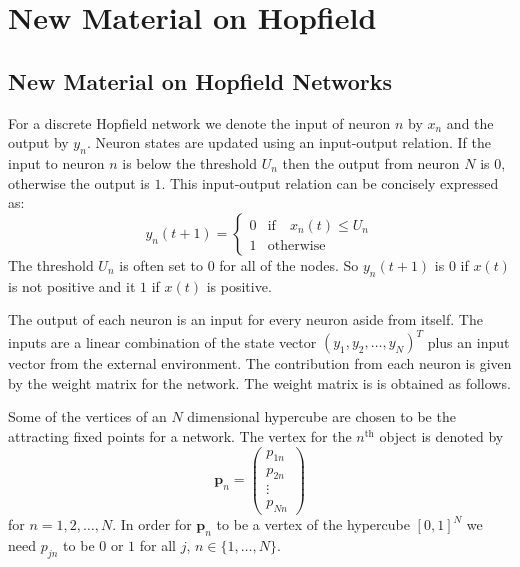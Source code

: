 \chapter{New Material on Hopfield}

\section{New Material on Hopfield Networks}

   For a discrete Hopfield network we denote the input of neuron $n$ by $x_n$ 
and the output by $y_n$.  Neuron states are updated using an input-output 
relation.  If the input to neuron $n$ is below the threshold $U_n$ then the
output from neuron $N$ is $0$, otherwise the output is $1$.  This input-output
relation can be concisely expressed as:
\begin{equation}\label{E:hopIO}
   y_n(t+1) = 
\left\{
\begin{array}{ll}
0 & \mbox{if} \quad x_n(t) \leq U_n   \\
1 & \mathrm{otherwise} 
\end{array}\right.
\end{equation}
The threshold $U_n$ is often set to $0$ for all of the nodes.  So $y_n(t+1)$ is 
$0$ if $x(t)$ is not positive and it $1$ if $x(t)$ is positive.  

   The output of each neuron is an input for every neuron aside from itself.
The inputs are a linear combination of the state vector $(y_1, y_2, \ldots,
y_N)^T$ plus an input vector from the external environment.  The contribution
from each neuron is given by the weight matrix for the network.  The weight
matrix is is obtained as follows.

   Some of the vertices of an $N$ dimensional hypercube are chosen to be the 
attracting fixed points for a network.  The vertex for the $n^{\mathrm{th}}$ 
object is denoted by 
\begin{equation*}
\boldsymbol{p}_n =
\begin{pmatrix}
p_{1n} \\ p_{2n} \\ \vdots \\ p_{Nn}
\end{pmatrix}
\end{equation*}
for $n = 1,2, \ldots, N$.  In order for $\boldsymbol{p}_n$ to be a vertex
of the hypercube $[0,1]^N$ we need $p_{jn}$ to be $0$ or $1$ for all $j$, $n 
\in \{1, \ldots, N\}$.

